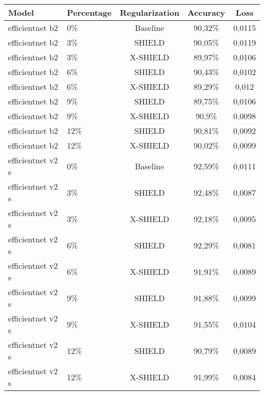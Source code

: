 \begin{tabular}{llccc}
\toprule
Model & Percentage & Regularization & Accuracy & Loss \\
\midrule
efficientnet b2 & 0\% & Baseline & 90,32\% & 0,0115 \\
efficientnet b2 & 3\% & SHIELD & 90,05\% & 0,0119 \\
efficientnet b2 & 3\% & X-SHIELD & 89,97\% & 0,0106 \\
efficientnet b2 & 6\% & SHIELD & 90,43\% & 0,0102 \\
efficientnet b2 & 6\% & X-SHIELD & 89,29\% & 0,012 \\
efficientnet b2 & 9\% & SHIELD & 89,75\% & 0,0106 \\
efficientnet b2 & 9\% & X-SHIELD & 90,9\% & 0,0098 \\
efficientnet b2 & 12\% & SHIELD & 90,81\% & 0,0092 \\
efficientnet b2 & 12\% & X-SHIELD & 90,02\% & 0,0099 \\
efficientnet v2 s & 0\% & Baseline & 92,59\% & 0,0111 \\
efficientnet v2 s & 3\% & SHIELD & 92,48\% & 0,0087 \\
efficientnet v2 s & 3\% & X-SHIELD & 92,18\% & 0,0095 \\
efficientnet v2 s & 6\% & SHIELD & 92,29\% & 0,0081 \\
efficientnet v2 s & 6\% & X-SHIELD & 91,91\% & 0,0089 \\
efficientnet v2 s & 9\% & SHIELD & 91,88\% & 0,0099 \\
efficientnet v2 s & 9\% & X-SHIELD & 91,55\% & 0,0104 \\
efficientnet v2 s & 12\% & SHIELD & 90,79\% & 0,0089 \\
efficientnet v2 s & 12\% & X-SHIELD & 91,99\% & 0,0084 \\
\bottomrule
\end{tabular}

